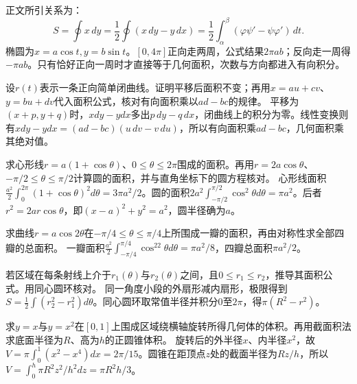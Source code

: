 \par\smallskip\noindent 正文所引关系为：
\begin{equation*}
S=\oint x\,dy=\frac12\oint(x\,dy-y\,dx)
 =\frac12\int_\alpha^\beta(\varphi\psi'-\psi\varphi')\,dt.
\end{equation*}
\solutionanswer
椭圆为\(x=a\cos t,y=b\sin t\)。\([0,4\pi]\)正向走两周，公式结果\(2\pi ab\)；反向走一周得\(-\pi ab\)。只有恰好正向一周时才直接等于几何面积，次数与方向都进入有向积分。


设\(r(t)\)表示一条正向简单闭曲线。证明平移后面积不变；再用\(x=au+cv\)、\(y=bu+dv\)代入面积公式，核对有向面积乘以\(ad-bc\)的规律。
\solutionanswer
平移为\((x+p,y+q)\)时，\(xdy-ydx\)多出\(p\,dy-q\,dx\)，闭曲线上的积分为零。线性变换则有\(xdy-ydx=(ad-bc)(u\,dv-v\,du)\)，所以有向面积乘\(ad-bc\)，几何面积乘其绝对值。


求心形线\(r=a(1+\cos\theta)\)、\(0\le\theta\le2\pi\)围成的面积。再用\(r=2a\cos\theta\)、\(-\pi/2\le\theta\le\pi/2\)计算圆的面积，并与直角坐标下的圆方程核对。
\solutionanswer
心形线面积\(\frac{a^2}2\int_0^{2\pi}(1+\cos\theta)^2d\theta=3\pi a^2/2\)。圆的面积\(2a^2\int_{-\pi/2}^{\pi/2}\cos^2\theta d\theta=\pi a^2\)。后者\(r^2=2ar\cos\theta\)，即\((x-a)^2+y^2=a^2\)，圆半径确为\(a\)。


求曲线\(r=a\cos2\theta\)在\(-\pi/4\le\theta\le\pi/4\)上所围成一瓣的面积，再由对称性求全部四瓣的总面积。
\solutionanswer
一瓣面积\(\frac{a^2}2\int_{-\pi/4}^{\pi/4}\cos^22\theta d\theta=\pi a^2/8\)，四瓣总面积\(\pi a^2/2\)。


若区域在每条射线上介于\(r_1(\theta)\)与\(r_2(\theta)\)之间，且\(0\le r_1\le r_2\)，推导其面积公式。用同心圆环核对。
\solutionanswer
同一角度小段的外扇形减内扇形，极限得到\(S=\frac12\int(r_2^2-r_1^2)d\theta\)。同心圆环取常值半径并积分\(0\)至\(2\pi\)，得\(\pi(R^2-r^2)\)。


求\(y=x\)与\(y=x^2\)在\([0,1]\)上围成区域绕横轴旋转所得几何体的体积。再用截面积法求底面半径为\(R\)、高为\(h\)的正圆锥体积。
\solutionanswer
旋转后的外半径\(x\)、内半径\(x^2\)，故\(V=\pi\int_0^1(x^2-x^4)dx=2\pi/15\)。圆锥在距顶点\(z\)处的截面半径为\(Rz/h\)，所以\(V=\int_0^h\pi R^2z^2/h^2dz=\pi R^2h/3\)。


